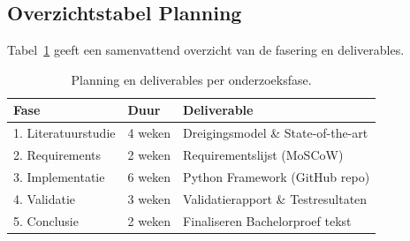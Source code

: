 \subsection{Overzichtstabel Planning}

Tabel~\ref{voorstel:tab:planning} geeft een samenvattend overzicht van de fasering en deliverables.

\begin{table}[htbp]
\centering
\caption{Planning en deliverables per onderzoeksfase.}
\label{voorstel:tab:planning}
\begin{tabular}{@{}llp{6cm}@{}}
\toprule
\textbf{Fase} & \textbf{Duur} & \textbf{Deliverable} \\ \midrule
1. Literatuurstudie & 4 weken & Dreigingsmodel \& State-of-the-art \\
2. Requirements & 2 weken & Requirementslijst (MoSCoW) \\
3. Implementatie & 6 weken & Python Framework (GitHub repo) \\
4. Validatie & 3 weken & Validatierapport \& Testresultaten \\
5. Conclusie & 2 weken & Finaliseren Bachelorproef tekst \\ \bottomrule
\end{tabular}
\end{table}

%
%
%
%
%
%


